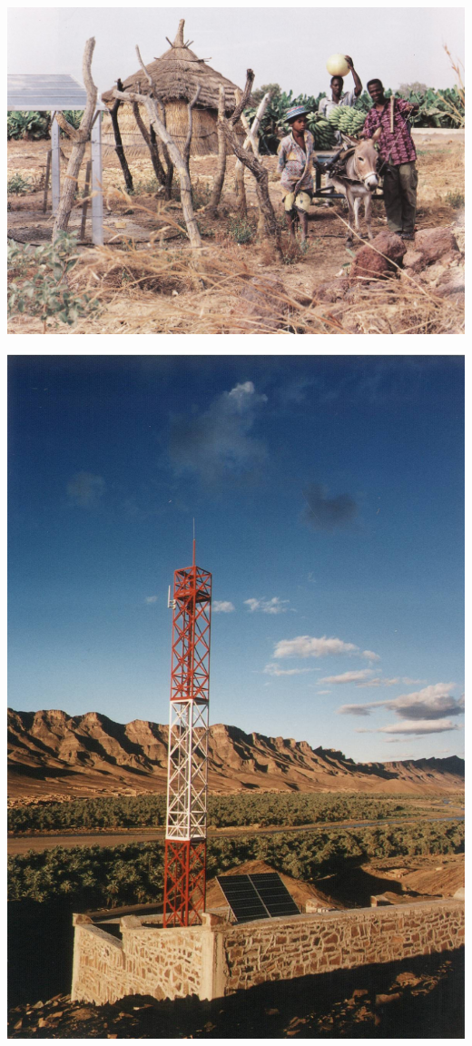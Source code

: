\documentclass[xcolor={usenames,svgnames,dvipsnames}]{beamer}
\begin{document}
\begin{frame}[label={sec:org88c1f28}]{}
\begin{center}
\includegraphics[width=.9\linewidth]{../figs/er.jpg}
\end{center}
\end{frame}

\begin{frame}[label={sec:orge02b4de}]{}
\begin{center}
\includegraphics[height=0.9\textheight]{../figs/TelefoniaRural.jpg}
\end{center}
\end{frame}
\end{document}
